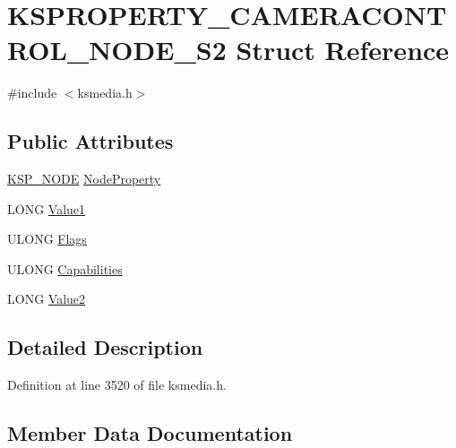 \hypertarget{struct_k_s_p_r_o_p_e_r_t_y___c_a_m_e_r_a_c_o_n_t_r_o_l___n_o_d_e___s2}{}\section{K\+S\+P\+R\+O\+P\+E\+R\+T\+Y\+\_\+\+C\+A\+M\+E\+R\+A\+C\+O\+N\+T\+R\+O\+L\+\_\+\+N\+O\+D\+E\+\_\+\+S2 Struct Reference}
\label{struct_k_s_p_r_o_p_e_r_t_y___c_a_m_e_r_a_c_o_n_t_r_o_l___n_o_d_e___s2}


{\ttfamily \#include $<$ksmedia.\+h$>$}

\subsection*{Public Attributes}
\begin{DoxyCompactItemize}
\item 
\hyperlink{struct_k_s_p___n_o_d_e}{K\+S\+P\+\_\+\+N\+O\+DE} \hyperlink{struct_k_s_p_r_o_p_e_r_t_y___c_a_m_e_r_a_c_o_n_t_r_o_l___n_o_d_e___s2_aefd5367c7574575e827bdacfdeb92008}{Node\+Property}
\item 
L\+O\+NG \hyperlink{struct_k_s_p_r_o_p_e_r_t_y___c_a_m_e_r_a_c_o_n_t_r_o_l___n_o_d_e___s2_a2e88d6c7724beda97a802c97bc4480c4}{Value1}
\item 
U\+L\+O\+NG \hyperlink{struct_k_s_p_r_o_p_e_r_t_y___c_a_m_e_r_a_c_o_n_t_r_o_l___n_o_d_e___s2_a2f60d184b09def0bd9b5e5406fe2a831}{Flags}
\item 
U\+L\+O\+NG \hyperlink{struct_k_s_p_r_o_p_e_r_t_y___c_a_m_e_r_a_c_o_n_t_r_o_l___n_o_d_e___s2_a40def25d0e75ec697daa015c285571c1}{Capabilities}
\item 
L\+O\+NG \hyperlink{struct_k_s_p_r_o_p_e_r_t_y___c_a_m_e_r_a_c_o_n_t_r_o_l___n_o_d_e___s2_a1e8b67d1bb471448346fcaee38d2d33f}{Value2}
\end{DoxyCompactItemize}


\subsection{Detailed Description}


Definition at line 3520 of file ksmedia.\+h.



\subsection{Member Data Documentation}
